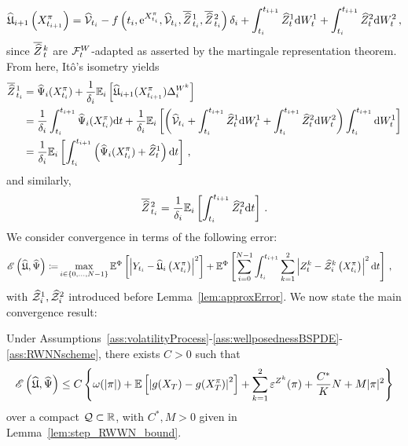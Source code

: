 \begin{equation}\label{eq:martingaleRep}
    \widehat{\mathfrak{U}}_{i+1}\left(X^\pi_{t_{i+1}}\right)=\widehat{\mathcal{V}}_{t_{i}}-f\left(t_{i},\mathrm{e}^{X^\pi_{t_{i}}}, \widehat{\mathcal{V}}_{t_{i}}, \overline{\widehat{Z}}\kern0.1em^{1}_{t_{i}}, \overline{\widehat{Z}}\kern0.1em^{2}_{t_{i}}\right) \delta_{i} +\int_{t_{i}}^{t_{i+1}}{\widehat{Z}}_{t}^1\mathrm{d} W^1_{t}+\int_{t_{i}}^{t_{i+1}} {\widehat{Z}}_{t}^2 \mathrm{d} W^2_{t}\,,
\end{equation}
since $\overline{\widehat{Z}}\kern0.1em^{k}_{t}$ are $\mathcal{F}_t^W$-adapted as asserted by the martingale representation theorem. 
From here, It\^o's isometry yields
\begin{align*}
    \overline{\widehat{Z}}\kern0.1em^{1}_{t_{i}} &= \widehat\Psi_i(X^\pi_{t_i}) +  \frac1{\delta_{i}}\mathbb{E}_i\left[\widehat{\mathfrak{U}}_{i+1}(X^\pi_{t_{i+1}})\Delta^{W^k}_{i} \right] \\
    &= \frac1{\delta_{i}}\int_{t_i}^{t_{i+1}}\widehat\Psi_i(X^\pi_{t_i})\mathrm{d} t +  \frac1{\delta_{i}}\mathbb{E}_i\left[\left(\widehat{\mathcal{V}}_{t_i} +\int_{t_{i}}^{t_{i+1}} \widehat{Z}_{t}^1 \mathrm{d} W^1_{t}+\int_{t_{i}}^{t_{i+1}} \widehat{Z}_{t}^2 \mathrm{d} W^2_{t} \right)\int_{t_i}^{t_{i+1}} \mathrm{d} W^1_t \right]  \\
    &= \frac1{\delta_{i}}\mathbb{E}_i\left[\int_{t_i}^{t_{i+1}}\left( \widehat\Psi_i(X^\pi_{t_i}) + \widehat{Z}_{t}^1 \right)\mathrm{d} t \right]\,,
\end{align*}
and similarly, 
$$
\overline{\widehat{Z}}\kern0.1em^{2}_{t_{i}} = \frac1{\delta_{i}}\mathbb{E}_i\left[\int_{t_i}^{t_{i+1}} \widehat{Z}_{t}^2 \mathrm{d} t \right]\,.
$$
We consider convergence in terms of the following error:
\[
\begin{aligned}
\mathscr{E}\left(\widehat{\mathfrak{U}}, \widehat\Psi\right) \coloneqq &\max _{i\in\{0, \dots, N-1\}} \mathbb{E}^\Phi\left[\left|Y_{t_i}-\widehat{\mathfrak{U}}_i\left(X^\pi_{t_i}\right)\right|^2\right]+\mathbb{E}^\Phi\left[\sum_{i=0}^{N-1} \int_{t_i}^{t_{i+1}}\sum_{k=1}^2\left|Z_t^k-\widehat{\mathcal{Z}}^k_i\left(X^\pi_{t_i}\right)\right|^2 \mathrm{d} t\right]\,,
\end{aligned}
\]
with $\widehat{\mathcal{Z}}^1_{i}, \widehat{\mathcal{Z}}^2_{i}$
introduced before Lemma~\ref{lem:approxError}. 
We now state the main convergence result:
\begin{theorem}\label{thm:convergence}
Under Assumptions~\ref{ass:volatilityProcess}-\ref{ass:wellposednessBSPDE}-\ref{ass:RWNNscheme},
there exists $C>0$ such that
\[
\mathscr{E}\left(\widehat{\mathfrak{U}}, \widehat\Psi\right) \leq C\left\{\omega(|\pi|) + \mathbb{E}\left[\left|g(X_T)-g(X^{\pi}_{T})\right|^2\right]+\sum_{k=1}^2\varepsilon^{Z^k}(\pi)+\frac{C^{*}}{K}N+ M|\pi|^2\right\}  
\]
over a compact $\mathcal{Q}\subset \mathbb{R}$, with $C^*, M>0$ given in Lemma~\ref{lem:step_RWWN_bound}.
\end{theorem}

